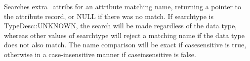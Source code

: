 Searches {\cf extra_attribs} for an attribute matching {\cf name},
returning a pointer to the attribute record, or NULL if there was no
match.  If {\cf searchtype} is {\cf TypeDesc::UNKNOWN}, the search will be made
regardless of the data type, whereas other values of {\cf searchtype}
will reject a matching name if the data type does not also match.  The
name comparison will be exact if {\cf casesensitive} is true, otherwise
in a case-insensitive manner if {\cf caseinsensitive} is false.
\apiend





\chapwidthend
